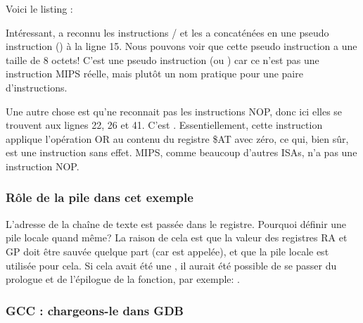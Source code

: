 Voici le listing \IDA:




Intéressant, \IDA a reconnu les instructions / et les a concaténées
en une pseudo instruction  () à la ligne 15.
Nous pouvons voir que cette pseudo instruction a une taille de 8 octets!
C'est une pseudo instruction (ou ) car ce n'est pas une instruction MIPS
réelle, mais plutôt un nom pratique pour une paire d'instructions.


Une autre chose est qu'\IDA ne reconnait pas les instructions \ac{NOP}, donc ici
elles se trouvent aux lignes 22, 26 et 41.
C'est .
Essentiellement, cette instruction applique l'opération OR au contenu du registre
\$AT avec zéro, ce qui, bien sûr, est une instruction sans effet.
MIPS, comme beaucoup d'autres \ac{ISA}s, n'a pas une instruction \ac{NOP}.

\subsubsection{Rôle de la pile dans cet exemple}

L'adresse de la chaîne de texte est passée dans le registre.
Pourquoi définir une pile locale quand même?
La raison de cela est que la valeur des registres \ac{RA} et GP doit être sauvée
quelque part (car \printf est appelée), et que la pile locale est utilisée pour cela.
Si cela avait été une , il aurait été
possible de se passer du prologue et de l'épilogue de la fonction, par
exemple: .

\subsubsection{GCC \Optimizing: chargeons-le dans GDB}



